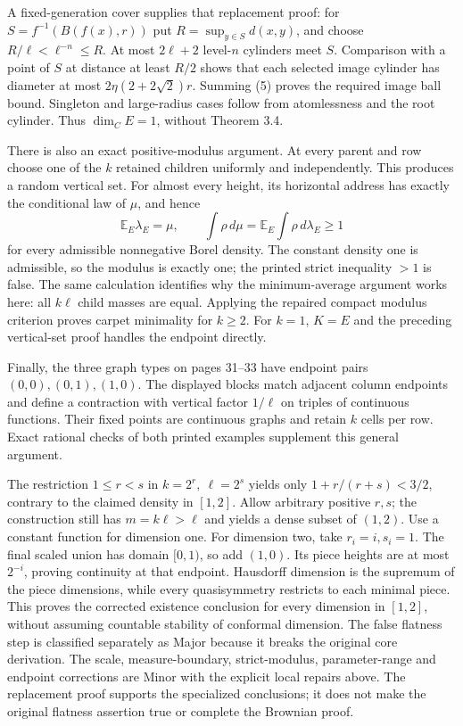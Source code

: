 \documentclass[10pt]{article}
\begin{document}
A fixed-generation cover supplies that replacement proof: for \(S=f^{-1}(B(f(x),r))\) put \(R=\sup_{y\in S}d(x,y)\), and choose \(R/\ell<\ell^{-n}\le R\). At most \(2\ell+2\) level-\(n\) cylinders meet \(S\). Comparison with a point of \(S\) at distance at least \(R/2\) shows that each selected image cylinder has diameter at most \(2\eta(2+2\sqrt2)r\). Summing (5) proves the required image ball bound. Singleton and large-radius cases follow from atomlessness and the root cylinder. Thus \(\dim_C E=1\), without Theorem 3.4.\par
There is also an exact positive-modulus argument. At every parent and row choose one of the \(k\) retained children uniformly and independently. This produces a random vertical set. For almost every height, its horizontal address has exactly the conditional law of \(\mu\), and hence \[\mathbb E_E\lambda_E=\mu,\qquad
 \int\rho\,d\mu=\mathbb E_E\int\rho\,d\lambda_E\ge1\] for every admissible nonnegative Borel density. The constant density one is admissible, so the modulus is exactly one; the printed strict inequality \(>1\) is false. The same calculation identifies why the minimum-average argument works here: all \(k\ell\) child masses are equal. Applying the repaired compact modulus criterion proves carpet minimality for \(k\ge2\). For \(k=1\), \(K=E\) and the preceding vertical-set proof handles the endpoint directly.\par
Finally, the three graph types on pages 31–33 have endpoint pairs \((0,0),(0,1),(1,0)\). The displayed blocks match adjacent column endpoints and define a contraction with vertical factor \(1/\ell\) on triples of continuous functions. Their fixed points are continuous graphs and retain \(k\) cells per row. Exact rational checks of both printed examples supplement this general argument.\par
The restriction \(1\le r<s\) in \(k=2^r,\ \ell=2^s\) yields only \(1+r/(r+s)<3/2\), contrary to the claimed density in \([1,2]\). Allow arbitrary positive \(r,s\); the construction still has \(m=k\ell>\ell\) and yields a dense subset of \((1,2)\). Use a constant function for dimension one. For dimension two, take \(r_i=i,s_i=1\). The final scaled union has domain \([0,1)\), so add \((1,0)\). Its piece heights are at most \(2^{-i}\), proving continuity at that endpoint. Hausdorff dimension is the supremum of the piece dimensions, while every quasisymmetry restricts to each minimal piece. This proves the corrected existence conclusion for every dimension in \([1,2]\), without assuming countable stability of conformal dimension. The false flatness step is classified separately as Major because it breaks the original core derivation. The scale, measure-boundary, strict-modulus, parameter-range and endpoint corrections are Minor with the explicit local repairs above. The replacement proof supports the specialized conclusions; it does not make the original flatness assertion true or complete the Brownian proof.\par
\end{document}
